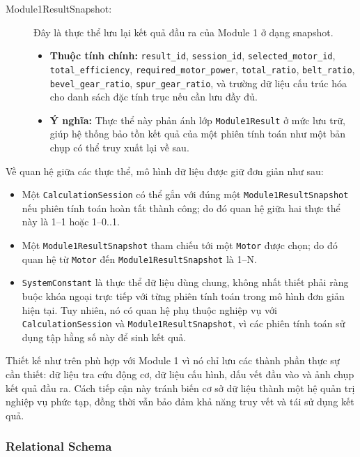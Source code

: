 \documentclass[a4paper]{article}
\begin{document}
\begin{description}
    \item[Module1ResultSnapshot:]
    Đây là thực thể lưu lại kết quả đầu ra của Module 1 ở dạng snapshot.
    \begin{itemize}
        \item \textbf{Thuộc tính chính:} \texttt{result\_id}, \texttt{session\_id}, \texttt{selected\_motor\_id}, \texttt{total\_efficiency}, \texttt{required\_motor\_power}, \texttt{total\_ratio}, \texttt{belt\_ratio}, \texttt{bevel\_gear\_ratio}, \texttt{spur\_gear\_ratio}, và trường dữ liệu cấu trúc hóa cho danh sách đặc tính trục nếu cần lưu đầy đủ.
        \item \textbf{Ý nghĩa:} Thực thể này phản ánh lớp \texttt{Module1Result} ở mức lưu trữ, giúp hệ thống bảo tồn kết quả của một phiên tính toán như một bản chụp có thể truy xuất lại về sau.
    \end{itemize}
\end{description}

Về quan hệ giữa các thực thể, mô hình dữ liệu được giữ đơn giản như sau:

\begin{itemize}
\item Một \texttt{CalculationSession} có thể gắn với đúng một \texttt{Module1ResultSnapshot} nếu phiên tính toán hoàn tất thành công; do đó quan hệ giữa hai thực thể này là 1--1 hoặc 1--0..1.
\item Một \texttt{Module1ResultSnapshot} tham chiếu tới một \texttt{Motor} được chọn; do đó quan hệ từ \texttt{Motor} đến \texttt{Module1ResultSnapshot} là 1--N.
\item \texttt{SystemConstant} là thực thể dữ liệu dùng chung, không nhất thiết phải ràng buộc khóa ngoại trực tiếp với từng phiên tính toán trong mô hình đơn giản hiện tại. Tuy nhiên, nó có quan hệ phụ thuộc nghiệp vụ với \texttt{CalculationSession} và \texttt{Module1ResultSnapshot}, vì các phiên tính toán sử dụng tập hằng số này để sinh kết quả.
\end{itemize}

Thiết kế như trên phù hợp với Module 1 vì nó chỉ lưu các thành phần thực sự cần thiết: dữ liệu tra cứu động cơ, dữ liệu cấu hình, dấu vết đầu vào và ảnh chụp kết quả đầu ra. Cách tiếp cận này tránh biến cơ sở dữ liệu thành một hệ quản trị nghiệp vụ phức tạp, đồng thời vẫn bảo đảm khả năng truy vết và tái sử dụng kết quả.

\subsubsection{Relational Schema}
\end{document}
